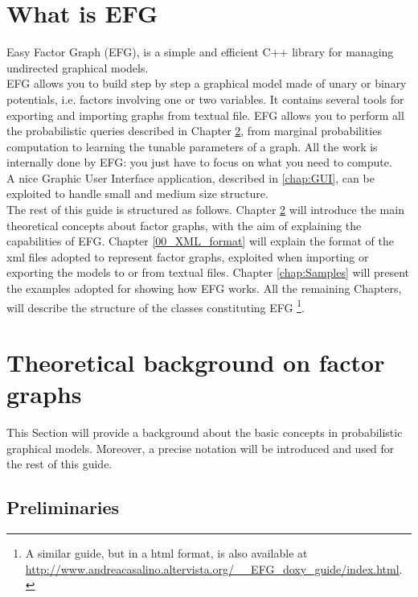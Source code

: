\chapter{What is EFG}

Easy Factor Graph (EFG), is a simple and efficient C++ library for managing undirected graphical models. 
\\
EFG allows you to build step by step a graphical model made of unary or binary potentials, i.e. factors involving one or two variables.
It contains several tools for exporting and importing graphs from textual file. EFG allows you to perform all the probabilistic queries described in Chapter \ref{chap:theory}, from
marginal probabilities computation to learning the tunable parameters of a graph.
All the work is internally done by EFG: you just have to focus on what you need to compute.
\\
A nice Graphic User Interface application, described in \ref{chap:GUI}, can be exploited to handle small and medium size structure.
\\
The rest of this guide is structured as follows. Chapter \ref{chap:theory} will introduce the main theoretical concepts about factor graphs, with the aim of explaining the capabilities of 
EFG. Chapter \ref{00_XML_format} will explain the format of the xml files adopted to represent factor graphs, exploited when importing or exporting the models to or from
textual files. Chapter \ref{chap:Samples} will present the examples adopted for showing how EFG works. All the remaining Chapters, will describe the structure of the classes constituting EFG 
\footnote{A similar guide, but in a html format, is also available at \url{http://www.andreacasalino.altervista.org/__EFG_doxy_guide/index.html}.}.

\newpage
\chapter{Theoretical background on factor graphs}
\label{chap:theory}

This Section will provide a background about the basic concepts in probabilistic graphical models.
Moreover, a precise notation will be introduced and used for the rest of this guide. 

\section{Preliminaries}
\label{sec:00:PREL}

